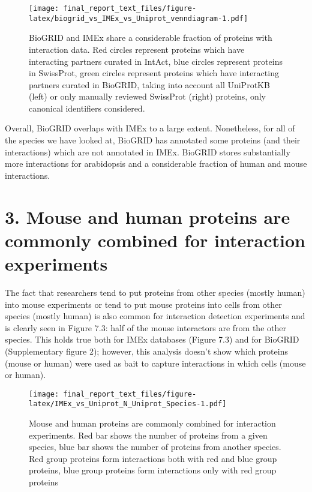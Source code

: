 \documentclass[12pt,]{report}
\begin{document}
\begin{figure}
\centering
\texttt{[image: final\_report\_text\_files/figure-latex/biogrid\_vs\_IMEx\_vs\_Uniprot\_venndiagram-1.pdf]}
\caption{BioGRID and IMEx share a considerable fraction of proteins with
interaction data. Red circles represent proteins which have interacting
partners curated in IntAct, blue circles represent proteins in
SwissProt, green circles represent proteins which have interacting
partners curated in BioGRID, taking into account all UniProtKB (left) or
only manually reviewed SwissProt (right) proteins, only canonical
identifiers considered.}
\end{figure}

Overall, BioGRID overlaps with IMEx to a large extent. Nonetheless, for
all of the species we have looked at, BioGRID has annotated some
proteins (and their interactions) which are not annotated in IMEx.
BioGRID stores substantially more interactions for arabidopsis and a
considerable fraction of human and mouse interactions.

\section{3. Mouse and human proteins are commonly combined for
interaction
experiments}\label{mouse-and-human-proteins-are-commonly-combined-for-interaction-experiments}

The fact that researchers tend to put proteins from other species
(mostly human) into mouse experiments or tend to put mouse proteins into
cells from other species (mostly human) is also common for interaction
detection experiments and is clearly seen in Figure 7.3: half of the
mouse interactors are from the other species. This holds true both for
IMEx databases (Figure 7.3) and for BioGRID (Supplementary figure 2);
however, this analysis doesn't show which proteins (mouse or human) were
used as bait to capture interactions in which cells (mouse or human).

\begin{figure}
\centering
\texttt{[image: final\_report\_text\_files/figure-latex/IMEx\_vs\_Uniprot\_N\_Uniprot\_Species-1.pdf]}
\caption{Mouse and human proteins are commonly combined for interaction
experiments. Red bar shows the number of proteins from a given species,
blue bar shows the number of proteins from another species. Red group
proteins form interactions both with red and blue group proteins, blue
group proteins form interactions only with red group proteins}
\end{figure}
\end{document}
